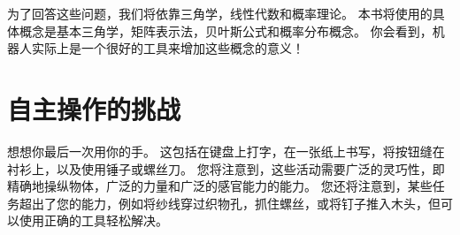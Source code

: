 
为了回答这些问题，我们将依靠三角学，线性代数和概率理论。 本书将使用的具体概念是基本三角学，矩阵表示法，贝叶斯公式和概率分布概念。 你会看到，机器人实际上是一个很好的工具来增加这些概念的意义！


\section{自主操作的挑战}


想想你最后一次用你的手。 这包括在键盘上打字，在一张纸上书写，将按钮缝在衬衫上，以及使用锤子或螺丝刀。 您将注意到，这些活动需要广泛的灵巧性，即精确地操纵物体，广泛的力量和广泛的感官能力的能力。 您还将注意到，某些任务超出了您的能力，例如将纱线穿过织物孔，抓住螺丝，或将钉子推入木头，但可以使用正确的工具轻松解决。


